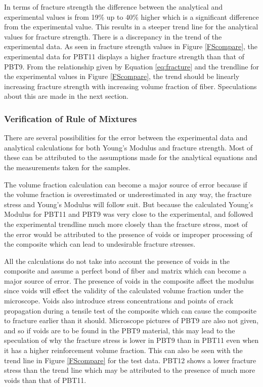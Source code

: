 \documentclass[11pt]{article}
\begin{document}
In terms of fracture strength the difference between the analytical and experimental values is from 19\% up to 40\% higher which is a significant difference from the experimental value. This results in a steeper trend line for the analytical values for fracture strength. There is a discrepancy in the trend of the experimental data. As seen in fracture strength values in Figure \ref{FScompare}, the experimental data for PBT11 displays a higher fracture strength than that of PBT9. From the relationship given by Equation \ref{eq:fracture} and the trendline for the experimental values in Figure \ref{FScompare}, the trend should be linearly increasing fracture strength with increasing volume fraction of fiber. Speculations about this are made in the next section.
\singlespacing

\subsubsection{Verification of Rule of Mixtures}

There are several possibilities for the error between the experimental data and analytical calculations for both Young's Modulus and fracture strength. Most of these can be attributed to the assumptions made for the analytical equations and the measurements taken for the samples.

The volume fraction calculation can become a major source of error because if the volume fraction is overestimated or underestimated in any way, the fracture stress and Young's Modulus will follow suit. But because the calculated Young's Modulus for PBT11 and PBT9 was very close to the experimental, and followed the experimental trendline much more closely than the fracture stress, most of the error would be attributed to the presence of voids or improper processing of the composite which can lead to undesirable fracture stresses.

All the calculations do not take into account the presence of voids in the composite and assume a perfect bond of fiber and matrix which can become a major source of error. The presence of voids in the composite affect the modulus since voids will effect the validity of the calculated volume fraction under the microscope. Voids also introduce stress concentrations and points of crack propagation during a tensile test of the composite which can cause the composite to fracture earlier than it should. Microscope pictures of PBT9 are also not given, and so if voids are to be found in the PBT9 material, this may lead to the speculation of why the fracture stress is lower in PBT9 than in PBT11 even when it has a higher reinforcement volume fraction. This can also be seen with the trend line in Figure \ref{FScompare} for the test data. PBT12 shows a lower fracture stress than the trend line which may be attributed to the presence of much more voids than that of PBT11. 
\end{document}
